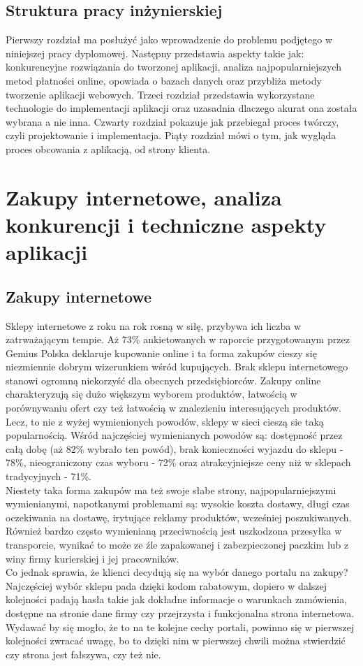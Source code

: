 \documentclass[12pt]{article}
\begin{document}
\begin{sloppypar}
{  \subsection{Struktura pracy inżynierskiej}
  {
    Pierwszy rozdział ma posłużyć jako wprowadzenie do problemu podjętego w niniejszej pracy dyplomowej.
    Następny przedstawia aspekty takie jak: konkurencyjne rozwiązania do tworzonej aplikacji,
    analiza najpopularniejszych metod płatności online, opowiada o bazach danych oraz przybliża
    metody tworzenie aplikacji webowych.
    Trzeci rozdział przedstawia wykorzystane technologie do implementacji aplikacji oraz uzasadnia dlaczego
    akurat ona została wybrana a nie inna.
    Czwarty rozdział pokazuje jak przebiegał proces twórczy, czyli projektowanie i implementacja. 
    Piąty rozdział mówi o tym, jak wygląda proces obcowania z aplikacją, od strony klienta.
  }
}

\section{Zakupy internetowe, analiza konkurencji i techniczne aspekty aplikacji}
{
  \subsection{Zakupy internetowe}
  {
    Sklepy internetowe z roku na rok rosną w siłę, przybywa ich liczba w zatrważającym tempie. 
    Aż 73\% ankietowanych w raporcie przygotowanym przez Gemius Polska\cite{gemius-report} deklaruje kupowanie online i ta forma zakupów cieszy się niezmiennie dobrym 
    wizerunkiem wśród kupujących. Brak sklepu internetowego stanowi ogromną niekorzyść dla obecnych przedsiębiorców. 
    Zakupy online charakteryzują się dużo większym wyborem produktów, łatwością w porównywaniu ofert czy też łatwością w znalezieniu interesujących produktów. 
    Lecz, to nie z wyżej wymienionych powodów, sklepy w sieci cieszą sie taką popularnością.
    Wśród najczęściej wymienianych powodów są: dostępność przez całą dobę (aż 82\% wybrało ten powód), brak konieczności wyjazdu do sklepu - 78\%, 
    nieograniczony czas wyboru - 72\% oraz atrakcyjniejsze ceny niż w sklepach tradycyjnych - 71\%.\\
    Niestety taka forma zakupów ma też swoje słabe strony, najpopularniejszymi
    wymienianymi, napotkanymi problemami są: wysokie koszta dostawy, długi czas oczekiwania na dostawę, irytujące reklamy produktów, wcześniej poszukiwanych.
    Również bardzo często wymienianą przeciwnością jest uszkodzona przesyłka w transporcie, wynikać to może ze źle zapakowanej i zabezpieczonej paczkim lub z winy 
    firmy kurierskiej i jej pracowników.\\
    Co jednak sprawia, że klienci decydują się na wybór danego portalu na zakupy?\\
    Najczęściej wybór sklepu pada dzięki kodom rabatowym, dopiero w dalszej kolejności padają hasła takie jak dokładne informacje o warunkach zamówienia,
    dostępne na stronie dane firmy czy przejrzysta i funkcjonalna strona internetowa. Wydawać by się mogło, że to na te kolejne cechy portali, powinno się w pierwszej kolejności
    zwracać uwagę, bo to dzięki nim w pierwszej chwili można stwierdzić czy strona jest fałszywa, czy też nie.
    }
}
\end{sloppypar}
\end{document}
